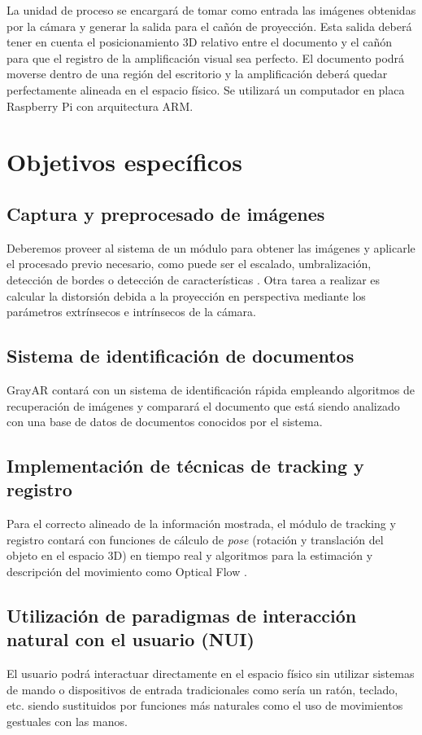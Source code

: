 La unidad de proceso se encargará de tomar como entrada las imágenes obtenidas por la cámara y generar la salida para el cañón de proyección. Esta salida deberá tener en cuenta el posicionamiento 3D relativo entre el documento y el cañón para que el registro de la amplificación visual sea perfecto. El documento podrá moverse dentro de una región del escritorio y la amplificación deberá quedar perfectamente alineada en el espacio físico. Se utilizará un computador en placa Raspberry Pi con arquitectura ARM.

\section{Objetivos específicos}

\subsection{Captura y preprocesado de imágenes}
Deberemos proveer al sistema de un módulo para obtener las imágenes y aplicarle el procesado previo necesario, como puede ser el escalado, umbralización, detección de bordes o detección de características \cite{Ortiz} \cite{Bay}. Otra tarea a realizar es calcular la distorsión debida a la proyección en perspectiva mediante los parámetros extrínsecos e intrínsecos de la cámara.

\subsection{Sistema de identificación de documentos}
GrayAR contará con un sistema de identificación rápida empleando algoritmos de recuperación de imágenes y comparará el documento que está siendo analizado con una base de datos de documentos conocidos por el sistema.

\subsection{Implementación de técnicas de tracking y registro}
Para el correcto alineado de la información mostrada, el módulo de tracking y registro contará con funciones de cálculo de \emph{pose} (rotación y translación del objeto en el espacio 3D) en tiempo real y algoritmos para la estimación y descripción del movimiento como Optical Flow \cite{LKanade}.   

\subsection{Utilización de paradigmas de interacción natural con el usuario  (NUI)}
El usuario podrá interactuar directamente en el espacio físico sin utilizar sistemas de mando o dispositivos de entrada tradicionales como sería un ratón, teclado, etc. siendo sustituidos por funciones más naturales como el uso de movimientos gestuales con las manos.

